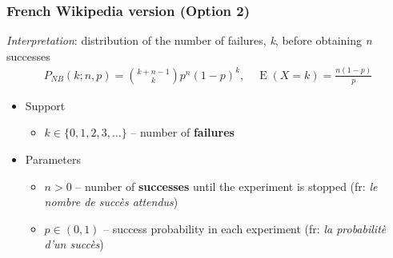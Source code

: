 \subsubsection*{French Wikipedia version (Option 2)}
\textit{Interpretation}: distribution of the number of failures, \emph{k}, before obtaining \emph{n} successes
\begin{align*}
P_{N\!B}(k;n,p) = {k + n - 1 \choose k} p^n (1-p)^k, \quad \operatorname E(X\!=\!k)=\frac{n(1-p)}{p}
\end{align*}
\begin{itemize}
\item 
Support
\begin{itemize}
\item 
$k \in \{ 0, 1, 2, 3, \dots\}$ -- number of \textbf{failures}
\end{itemize}
\item 
Parameters 
\begin{itemize}
\item 
$n > 0$ -- number of \textbf{successes} until the experiment is stopped (fr: \emph{le nombre de succ\`es attendus})
\item 
$p \in (0,1)$ -- success probability in each experiment (fr: \emph{la probabilit\`e d'un succ\`es})
\end{itemize}
\end{itemize}

